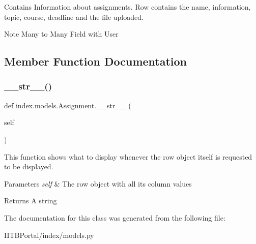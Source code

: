 Contains Information about assignments. Row contains the name, information, topic, course, deadline and the file uploaded. \begin{DoxyNote}{Note}
Many to Many Field with User 
\end{DoxyNote}


\subsection{Member Function Documentation}
\mbox{\label{classindex_1_1models_1_1Assignment_a3979c226df312c7527826796407afe7d}} 
\subsubsection{\texorpdfstring{\+\_\+\+\_\+str\+\_\+\+\_\+()}{\_\_str\_\_()}}
{\footnotesize\ttfamily def index.\+models.\+Assignment.\+\_\+\+\_\+str\+\_\+\+\_\+ (\begin{DoxyParamCaption}\item[{}]{self }\end{DoxyParamCaption})}



This function shows what to display whenever the row object itself is requested to be displayed. 


\begin{DoxyParams}{Parameters}
{\em self} & The row object with all its column values \\
\hline
\end{DoxyParams}
\begin{DoxyReturn}{Returns}
A string 
\end{DoxyReturn}


The documentation for this class was generated from the following file\+:\begin{DoxyCompactItemize}
\item 
I\+I\+T\+B\+Portal/index/models.\+py\end{DoxyCompactItemize}
